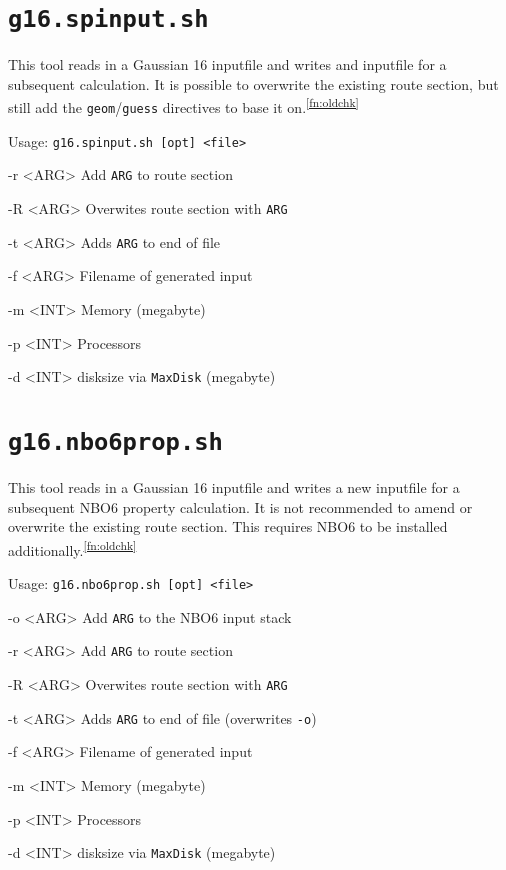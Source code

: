 \documentclass[final, a4paper, columns=3, margin=1.0cm, 10pt]{refcard}
\newcommand*{\footnoteref}[1]{\textsuperscript{\ref{#1}}}
\begin{document}
\section{\texttt{g16.spinput.sh}}

This tool reads in a Gaussian 16 inputfile and 
writes and inputfile for a subsequent calculation.
It is possible to overwrite the existing route section, but still
add the \texttt{geom}/\texttt{guess} directives to base it on.\footnoteref{fn:oldchk}

Usage: \texttt{g16.spinput.sh [opt] <file>}

\begin{refcardlist}[labelfont=\ttfamily]
  \item[-r <ARG>] Add \texttt{ARG} to route section
  \item[-R <ARG>] Overwites route section with \texttt{ARG}
  \item[-t <ARG>] Adds \texttt{ARG} to end of file
  \item[-f <ARG>] Filename of generated input
  \item[-m <INT>] Memory (megabyte)
  \item[-p <INT>] Processors
  \item[-d <INT>] disksize via \texttt{MaxDisk} (megabyte)
\end{refcardlist}

\section{\texttt{g16.nbo6prop.sh}}

This tool reads in a Gaussian 16 inputfile and 
writes a new inputfile for a subsequent NBO6 property calculation.
It is not recommended to amend or overwrite the existing route section.
This requires NBO6 to be installed additionally.\footnoteref{fn:oldchk}

Usage: \texttt{g16.nbo6prop.sh [opt] <file>}

\begin{refcardlist}[labelfont=\ttfamily]
  \item[-o <ARG>] Add \texttt{ARG} to the NBO6 input stack
  \item[-r <ARG>] Add \texttt{ARG} to route section
  \item[-R <ARG>] Overwites route section with \texttt{ARG}
  \item[-t <ARG>] Adds \texttt{ARG} to end of file (overwrites \texttt{-o})
  \item[-f <ARG>] Filename of generated input
  \item[-m <INT>] Memory (megabyte)
  \item[-p <INT>] Processors
  \item[-d <INT>] disksize via \texttt{MaxDisk} (megabyte)
\end{refcardlist}
\end{document}
